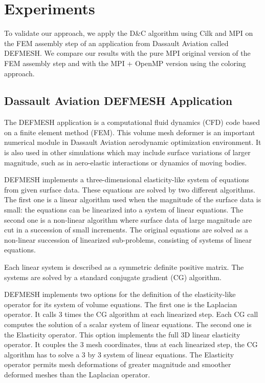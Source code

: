 \documentclass[10pt]{IOS-Book-Article}
\begin{document}
\section{Experiments}
To validate our approach, we apply the D\&C algorithm using Cilk and MPI on the FEM assembly step of an application from Dassault Aviation called DEFMESH.
We compare our results with the pure MPI original version of the FEM assembly step and with the MPI + OpenMP version using the coloring approach.

\subsection{Dassault Aviation DEFMESH Application}
The DEFMESH application is a computational fluid dynamics (CFD) code based on a finite element method (FEM).
This volume mesh deformer is an important numerical module in Dassault Aviation aerodynamic optimization environment.
It is also used in other simulations which may include surface variations of larger magnitude, such as in aero-elastic interactions or dynamics of moving bodies.

DEFMESH implements a three-dimensional elasticity-like system of equations from given surface data.
These equations are solved by two different algorithms.
The first one is a linear algorithm used when the magnitude of the surface data is small: the equations can be linearized into a system of linear equations.
The second one is a non-linear algorithm where surface data of large magnitude are cut in a succession of small increments.
The original equations are solved as a non-linear succession of linearized sub-problems, consisting of systems of linear equations.
 
Each linear system is described as a symmetric definite positive matrix. The systems are solved by a standard conjugate gradient (CG) algorithm.

DEFMESH implements two options for the definition of the elasticity-like operator for its system of volume equations.
The first one is  the Laplacian operator. It calls 3 times the CG algorithm at each linearized step.  Each CG call computes the solution of a scalar system of linear equations.
The second one is the Elasticity operator. This option implements the full 3D linear elasticity operator.
It couples the 3 mesh coordinates, thus at each linearized step, the CG algorithm has to solve a 3 by 3 system of linear equations.
The Elasticity operator permits mesh deformations of greater magnitude and smoother deformed meshes than the Laplacian operator.
\end{document}
